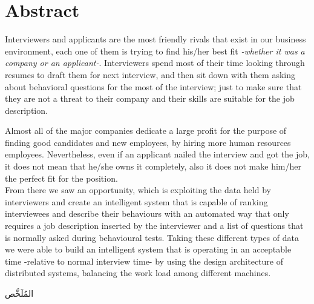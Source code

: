 \documentclass[a4paper,12pt]{report}
\begin{document}
\thispagestyle{empty}


\chapter*{Abstract}
Interviewers and applicants are the most friendly rivals that exist in our business environment, each one of them is trying to find his/her best fit \textit{-whether it was a company or an applicant-}. Interviewers spend most of their time looking through resumes to draft them for next interview, and then sit down with them asking about behavioral questions for the most of the interview; just to make sure that they are not a threat to their company and their skills are suitable for the job description.

Almost all of the major companies dedicate a large profit for the purpose of finding good candidates and new employees, by hiring more human resources employees. Nevertheless, even if an applicant nailed the interview and got the job, it does not mean that he/she owns it completely, also it does not make him/her the perfect fit for the position.\\

From there we saw an opportunity, which is exploiting the data held by interviewers and create an intelligent system that is capable of ranking interviewees and describe their behaviours with an automated way that only requires a job description inserted by the interviewer and a list of questions that is normally asked during behavioural tests. Taking these different types of data we were able to build an intelligent system that is operating in an acceptable time -relative to normal interview time- by using the design architecture of distributed systems, balancing the work load among different machines.
\thispagestyle{empty} 

\newpage
{}
\begin{arabtext}
{\huge
المُلَخَّص
}\vspace{20pt}

\end{arabtext}
\thispagestyle{empty}
\end{document}
